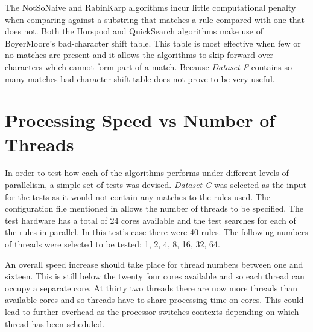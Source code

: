 \documentclass[11pt]{article}
\begin{document}
The NotSoNaive and RabinKarp algorithms incur little computational penalty when comparing against a substring that matches a rule compared with one that does not. 
Both the Horspool and QuickSearch algorithms make use of BoyerMoore's \citep{boyer1977} bad-character shift table. This table is most effective when few or no matches are present and it allows the algorithms to skip forward over characters which cannot form part of a match. Because \textit{Dataset F} contains so many matches bad-character shift table does not prove to be very useful.


\section{Processing Speed vs Number of Threads}

In order to test how each of the algorithms performs under different levels of parallelism, a simple set of tests was devised. \textit{Dataset C} was selected as the input for the tests as it would not contain any matches to the rules used.  The configuration file mentioned in \citet{hunt2016} allows the number of threads to be specified. The test hardware has a total of 24 cores available and the test searches for each of the rules in parallel. In this test's case there were 40 rules. The following numbers of threads were selected to be tested: 1, 2, 4, 8, 16, 32, 64.

An overall speed increase should take place for thread numbers between one and sixteen. This is still below the twenty four cores available and so each thread can occupy a separate core. At thirty two threads there are now more threads than available cores and so threads have to share processing time on cores. This could lead to further overhead as the processor switches contexts depending on which thread has been scheduled.
\end{document}

